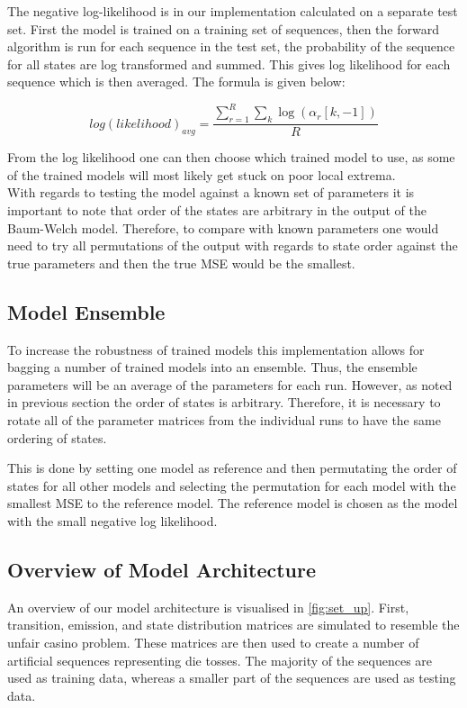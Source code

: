 The negative log-likelihood is in our implementation calculated on a separate test set. First the model is trained on a training set of sequences, then the forward algorithm is run for each sequence in the test set, the probability of the sequence for all states are log transformed and summed. This gives log likelihood for each sequence which is then averaged. The formula is given below:

\begin{equation}
    log(likelihood)_{avg} = \frac{\sum_{r=1}^R \sum_k\log(\alpha_r[k,-1]) }{R}
\end{equation}

From the log likelihood one can then choose which trained model to use, as some of the trained models will most likely get stuck on poor local extrema. \\

\noindent
With regards to testing the model against a known set of parameters it is important to note that order of the states are arbitrary in the output of the Baum-Welch model. Therefore, to compare with known parameters one would need to try all permutations of the output with regards to state order against the true parameters and then the true MSE would be the smallest.

\subsection{Model Ensemble}

To increase the robustness of trained models this implementation allows for bagging a number of trained models into an ensemble. Thus, the ensemble parameters will be an average of the parameters for each run. However, as noted in previous section the order of states is arbitrary. Therefore, it is necessary to rotate all of the parameter matrices from the individual runs to have the same ordering of states.

This is done by setting one model as reference and then permutating the order of states for all other models and selecting the permutation for each model with the smallest MSE to the reference model. The reference model is chosen as the model with the small negative log likelihood. 




\subsection{Overview of Model Architecture} 
An overview of our model architecture is visualised in \autoref{fig:set_up}. First, transition, emission, and state distribution matrices are simulated to resemble the unfair casino problem. These matrices are then used to create a number of artificial sequences representing die tosses. The majority of the sequences are used as training data, whereas a smaller part of the sequences are used as testing data. 

